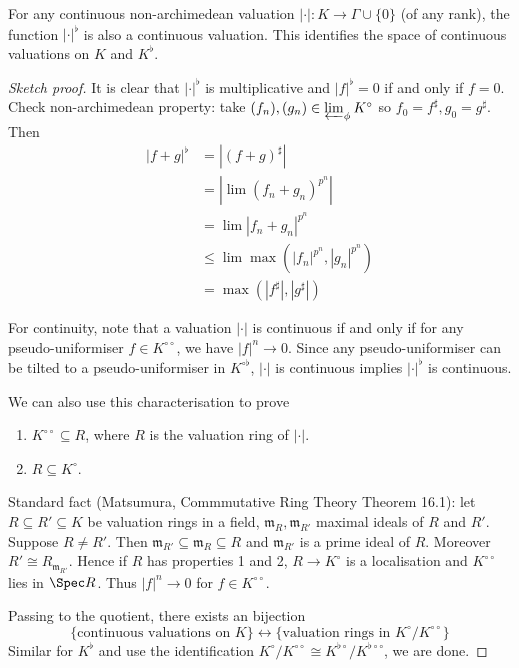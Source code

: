 \documentclass[a4paper]{article}
\newcommand{\tilt}{\flat} %
\begin{document}
\begin{proposition}
  For any continuous non-archimedean valuation \(|\cdot| : K \to \Gamma \cup \{0\}\) (of any rank), the function \(|\cdot|^\tilt\) is also a continuous valuation. This identifies the space of continuous valuations on \(K\) and \(K^\tilt\).
\end{proposition}

\begin{proof}[Sketch proof]
  It is clear that \(|\cdot|^\tilt\) is multiplicative and \(|f|^\tilt = 0\) if and only if \(f = 0\). Check non-archimedean property: take \((f_n), (g_n) \in \varprojlim_\phi K^\circ\) so \(f_0 = f^\sharp, g_0 = g^\sharp\). Then
  \begin{align*}
    |f + g|^\tilt
    &= |(f + g)^\sharp| \\
    &= |\lim (f_n + g_n)^{p^n}| \\
    &= \lim |f_n + g_n|^{p^n} \\
    &\leq \lim \max(|f_n|^{p^n}, |g_n|^{p^n}) \\
    &= \max(|f^\sharp|, |g^\sharp|)
  \end{align*}

  For continuity, note that a valuation \(|\cdot|\) is continuous if and only if for any pseudo-uniformiser \(f \in K^{\circ \circ}\), we have \(|f|^n \to 0\). Since any pseudo-uniformiser can be tilted to a pseudo-uniformiser in \(K^{\circ \tilt}\), \(|\cdot|\) is continuous implies \(|\cdot|^\tilt\) is continuous.

  We can also use this characterisation to prove
  \begin{enumerate}
  \item \(K^{\circ \circ} \subseteq R\), where \(R\) is the valuation ring of \(|\cdot|\).
  \item \(R \subseteq K^\circ\).
  \end{enumerate}

  Standard fact (Matsumura, Commmutative Ring Theory Theorem 16.1): let \(R \subseteq R' \subseteq K\) be valuation rings in a field, \(\mathfrak m_R, \mathfrak m_{R'}\) maximal ideals of \(R\) and \(R'\). Suppose \(R \ne R'\). Then \(\mathfrak m_{R'} \subseteq \mathfrak m_R \subseteq R\) and \(\mathfrak m_{R'}\) is a prime ideal of \(R\). Moreover \(R' \cong R_{\mathfrak m_{R'}}\). Hence if \(R\) has properties 1 and 2, \(R \to K^\circ\) is a localisation and \(K^{\circ \circ}\) lies in \(\Spec R\). Thus \(|f|^n \to 0\) for \(f \in K^{\circ \circ}\).
  
  Passing to the quotient, there exists an bijection
  \[
    \{\text{continuous valuations on } K\} \leftrightarrow \{\text{valuation rings in } K^\circ/K^{\circ \circ}\}
  \]
  Similar for \(K^\tilt\) and use the identification \(K^\circ/K^{\circ \circ} \cong K^{\tilt \circ}/K^{\tilt \circ\circ}\), we are done.
\end{proof}
\end{document}
